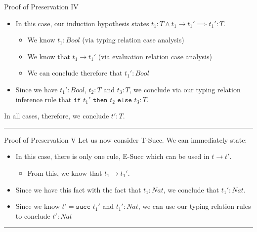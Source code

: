 \documentclass[11pt]{beamer}
\begin{document}
\begin{frame}[fragile=singleslide]{Proof of Preservation IV}
\begin{itemize}
\item In this case, our induction hypothesis states $t_1 : T \land t_1 \rightarrow t_1' \implies t_1' : T$.
\begin{itemize}
\item We know $t_1 : Bool$ (via typing relation case analysis)
\item We know that $t_1 \rightarrow t_1'$ (via evaluation relation case analysis)
\item We can conclude therefore that $t_1' : Bool$
\end{itemize}
\item Since we have $t_1' : Bool$, $t_2 : T$ and $t_3 : T$, we conclude via our typing relation inference rule that $\texttt{if } t_1' \texttt{ then } t_2 \texttt{ else } t_3 : T$.
\end{itemize}
In all cases, therefore, we conclude $t' : T$. \\
\vspace{1em}
\hrule
{}

\end{frame}


\begin{frame}[fragile=singleslide]{Proof of Preservation V}
Let us now consider T-Succ.  We can immediately state: 
\begin{itemize}
\item In this case, there is only one rule, E-Succ which can be used in $t \rightarrow t'$.
\begin{itemize}
\item From this, we know that $t_1 \rightarrow t_1'$. 
\end{itemize}
\item Since we have this fact with the fact that $t_1 : Nat$, we conclude that $t_1' : Nat$.  
\item Since we know $t' = \texttt{succ } t_1'$ and $t_1' : Nat$, we can use our typing relation rules to conclude $t' : Nat$ \\
\end{itemize} 
\hrule 
\vspace{0.5em}
\end{frame}
\end{document}
